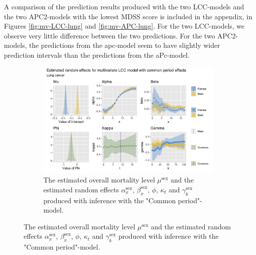 \newpar A comparison of the prediction results produced with the two LCC-models and the two APC2-models with the lowest MDSS score is included in the appendix, in Figures \ref{fig:mv-LCC-lung} and \ref{fig:mv-APC-lung}.
For the two LCC-models, we observe very little difference between the two predictions. For the two APC2-models, the predictions from the apc-model seem to have slightly wider prediction intervals than the predictions from the aPc-model.

\begin{figure}
    \centering
    \begin{subfigure}[b]{.75\linewidth}
        \includegraphics[width=\linewidth]{real-data/real-data-multivariate/Figures/effects-LCC-common-period-lung.png}
        \caption{The estimated overall mortality level $\mu^{\text{sex}}$ and the estimated random effects $\alpha_x^{\text{sex}}$, $\beta_x^{\text{sex}}$, $\phi$, $\kappa_t$ and $\gamma_k^{\text{sex}}$ produced with inference with the "Common period"-model.}
        \label{fig:effects-LCC-lung-top}
    \end{subfigure}
    

\end{figure}
